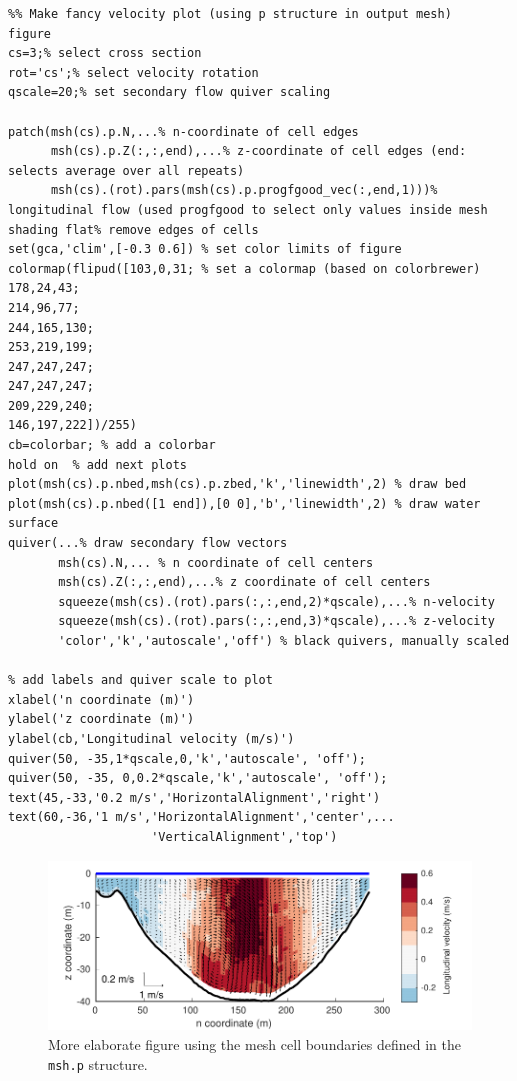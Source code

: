 \documentclass{book}
\newcommand{\ml}[1]{\lstinline{#1}}
\begin{document}
\begin{lstlisting}
%% Make fancy velocity plot (using p structure in output mesh)
figure
cs=3;% select cross section
rot='cs';% select velocity rotation
qscale=20;% set secondary flow quiver scaling

patch(msh(cs).p.N,...% n-coordinate of cell edges
      msh(cs).p.Z(:,:,end),...% z-coordinate of cell edges (end: selects average over all repeats)
      msh(cs).(rot).pars(msh(cs).p.progfgood_vec(:,end,1)))% longitudinal flow (used progfgood to select only values inside mesh
shading flat% remove edges of cells
set(gca,'clim',[-0.3 0.6]) % set color limits of figure
colormap(flipud([103,0,31; % set a colormap (based on colorbrewer)
178,24,43;  
214,96,77;
244,165,130;
253,219,199;
247,247,247;
247,247,247;
209,229,240;
146,197,222])/255)
cb=colorbar; % add a colorbar
hold on  % add next plots
plot(msh(cs).p.nbed,msh(cs).p.zbed,'k','linewidth',2) % draw bed
plot(msh(cs).p.nbed([1 end]),[0 0],'b','linewidth',2) % draw water surface
quiver(...% draw secondary flow vectors
       msh(cs).N,... % n coordinate of cell centers
       msh(cs).Z(:,:,end),...% z coordinate of cell centers
       squeeze(msh(cs).(rot).pars(:,:,end,2)*qscale),...% n-velocity
       squeeze(msh(cs).(rot).pars(:,:,end,3)*qscale),...% z-velocity
       'color','k','autoscale','off') % black quivers, manually scaled

% add labels and quiver scale to plot
xlabel('n coordinate (m)')
ylabel('z coordinate (m)')
ylabel(cb,'Longitudinal velocity (m/s)')
quiver(50, -35,1*qscale,0,'k','autoscale', 'off');
quiver(50, -35, 0,0.2*qscale,'k','autoscale', 'off');
text(45,-33,'0.2 m/s','HorizontalAlignment','right')
text(60,-36,'1 m/s','HorizontalAlignment','center',...
                    'VerticalAlignment','top')
\end{lstlisting}

\begin{figure}[p]
  \centering
  \includegraphics[width=\linewidth]{figures/proc_trans_results.pdf}
  \caption{More elaborate figure using the mesh cell boundaries defined in the \ml{msh.p} structure.}
  \label{fig:fancy_plot}
\end{figure}
\end{document}
